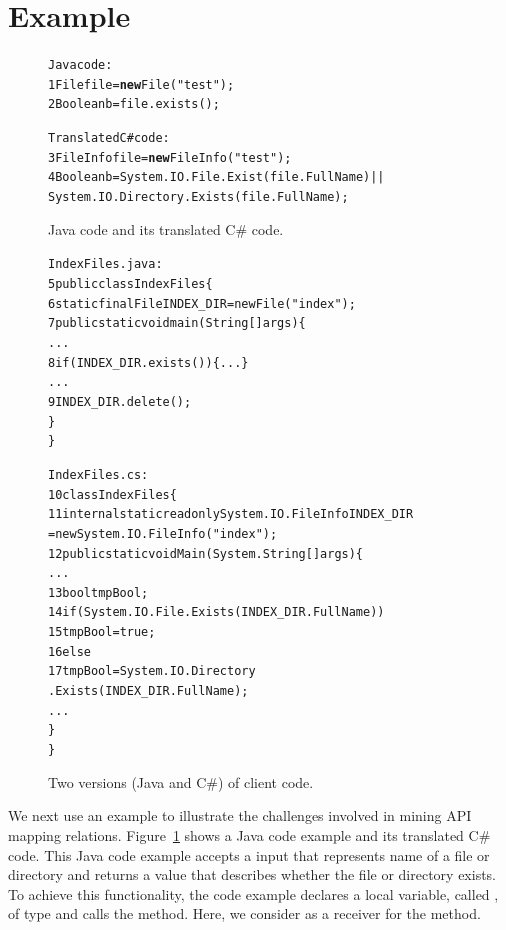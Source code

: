 \section{Example}
\label{sec:example}
\begin{figure}[t]
\begin{CodeOut}
\begin{alltt}
  Java code:
1  File file = \textbf{new} File("test");
2  Boolean b = file.exists();

  Translated C\# code:
3  FileInfo file = \textbf{new} FileInfo("test");
4  Boolean b = System.IO.File.Exist(file.FullName)||
           System.IO.Directory.Exists(file.FullName);
\end{alltt}
\end{CodeOut}\vspace*{-4ex}
\caption{\label{fig:challenge}Java code and its translated C\# code.}%
\end{figure}
\begin{figure}[t]
\begin{CodeOut}\vspace*{-1ex}
\begin{alltt}
  IndexFiles.java:
5 public class IndexFiles \{
6   static final File INDEX_DIR = new File("index");
7   public static void main(String[] args) \{
      ...
8     if (INDEX_DIR.exists()) \{...\}
      ...
9       INDEX_DIR.delete();
    \}
  \}

  IndexFiles.cs:
10 class IndexFiles\{
11   internal static readonly System.IO.FileInfo INDEX_DIR
          = new System.IO.FileInfo("index");
12   public static void  Main(System.String[] args)\{
      ...
13     bool tmpBool;
14     if (System.IO.File.Exists(INDEX_DIR.FullName))
15       tmpBool = true;
16    else
17       tmpBool = System.IO.Directory
                         .Exists(INDEX_DIR.FullName);
      ...
    \}
 \}
\end{alltt}
\end{CodeOut}\vspace*{-4ex}
\caption{\label{fig:clientcode} Two versions (Java and C\#) of
client code.}\vspace*{-2ex}
\end{figure}

We next use an example to illustrate the challenges involved in
mining API mapping relations. Figure~\ref{fig:challenge} shows a
Java code example and its translated C\# code. This Java code
example accepts a  input that represents name of a
file or directory and returns a  value that
describes whether the file or directory exists. To achieve this
functionality, the code example declares a local variable, called
, of type  and calls the
 method. Here, we consider  as a
receiver for the  method.

